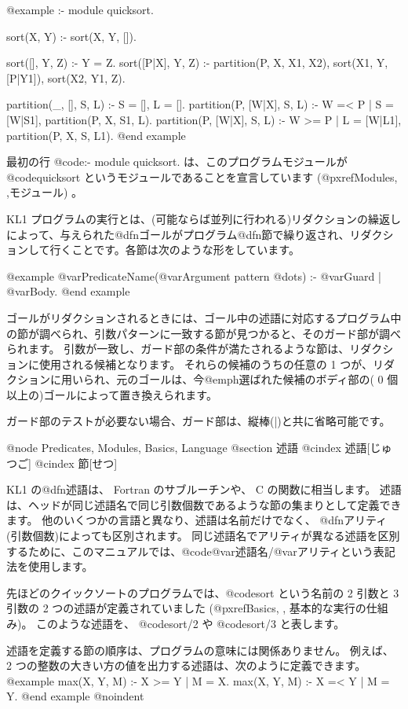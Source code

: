 @example
:- module quicksort.

sort(X, Y) :- sort(X, Y, []).

sort([], Y, Z) :- Y = Z.
sort([P|X], Y, Z) :-
    partition(P, X, X1, X2),
    sort(X1, Y, [P|Y1]),
    sort(X2, Y1, Z).

partition(_, [], S, L) :-
    S = [],
    L = [].
partition(P, [W|X], S, L) :- W =< P |
    S = [W|S1],
    partition(P, X, S1, L).
partition(P, [W|X], S, L) :- W >= P |
    L = [W|L1],
    partition(P, X, S, L1).
@end example

最初の行 @code{:- module quicksort.} は、このプログラムモジュールが @code{quicksort} というモジュールであることを宣言しています
(@pxref{Modules, ,モジュール}) 。

KL1 プログラムの実行とは、(可能ならば並列に行われる)リダクションの繰返しによって、与えられた@dfn{ゴール}がプログラム@dfn{節}で繰り返され、リダクションして行くことです。各節は次のような形をしています。

@example
@var{PredicateName}(@var{Argument pattern} @dots{}) :- @var{Guard} | @var{Body}.
@end example

ゴールがリダクションされるときには、ゴール中の述語に対応するプログラム中の節が調べられ、引数パターンに一致する節が見つかると、そのガード部が調べられます。
引数が一致し、ガード部の条件が満たされるような節は、リダクションに使用される候補となります。
それらの候補のうちの任意の  1 つが、リダクションに用いられ、元のゴールは、今@emph{選ばれた候補}のボディ部の( 0 個以上の)ゴールによって置き換えられます。

ガード部のテストが必要ない場合、ガード部は、縦棒(|)と共に省略可能です。

@node Predicates, Modules, Basics, Language
@section 述語
@cindex 述語[じゅつご]
@cindex 節[せつ]

KL1 の@dfn{述語}は、 Fortran のサブルーチンや、 C の関数に相当します。
述語は、ヘッドが同じ述語名で同じ引数個数であるような節の集まりとして定義できます。
他のいくつかの言語と異なり、述語は名前だけでなく、
@dfn{アリティ(引数個数)}によっても区別されます。
同じ述語名でアリティが異なる述語を区別するために、このマニュアルでは、@code{@var{述語名}/@var{アリティ}}という表記法を使用します。

先ほどのクイックソートのプログラムでは、@code{sort} という名前の 2 引数と 3 引数の 2 つの述語が定義されていました
(@pxref{Basics, , 基本的な実行の仕組み})。
このような述語を、 @code{sort/2} や @code{sort/3} と表します。

述語を定義する節の順序は、プログラムの意味には関係ありません。
例えば、 2 つの整数の大きい方の値を出力する述語は、次のように定義できます。
@example
max(X, Y, M) :- X >= Y | M = X.
max(X, Y, M) :- X =< Y | M = Y.
@end example
@noindent

